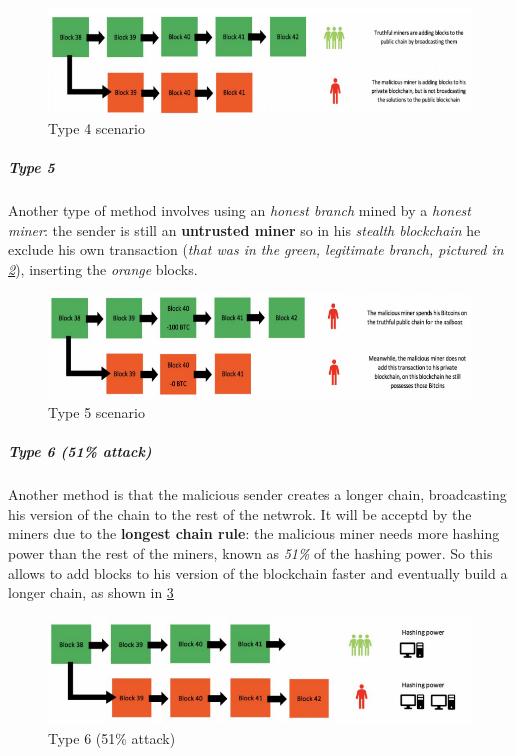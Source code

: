 \documentclass[10pt,a4paper]{report}
\begin{document}
\begin{figure}[h]
	\centering
	\includegraphics[scale=0.50]{images/Pasted image 20230412113653.png}
  	\caption{Type 4 scenario}
  	\label{type-4}
  \end{figure}

\subparagraph{Type 5}\label{sec:type-5}
Another type of method involves using an \textit{honest branch} mined by a \textit{honest miner}: the sender is still an \textbf{untrusted miner} so in his \textit{stealth blockchain} he exclude his own transaction (\textit{that was in the green, legitimate branch, pictured in \ref{type-5-attack}}), inserting the \textit{orange} blocks.
\begin{figure}[h]
	\centering
	\includegraphics[scale=0.50]{images/Pasted image 20230412113953.png}
	\caption{Type 5 scenario}
\label{type-5-attack}
\end{figure}

\subparagraph{Type 6 (51\% attack)}\label{sec:type-6-51-attack}
Another method is that the malicious sender creates a longer chain, broadcasting his version of the chain to the rest of the netwrok. It will be acceptd by the miners due to the \textbf{longest chain rule}: the malicious miner needs more hashing power than the rest of the miners, known as \textit{51\%} of the hashing power. So this allows to add blocks to his version of the blockchain faster and eventually build a longer chain, as shown in \ref{51-attack}
\begin{figure}[h]
	\centering
	\includegraphics[scale=0.50]{images/Pasted image 20230417104836.png}
	\caption{Type 6 (51\% attack)}
	\label{51-attack}
\end{figure}
\end{document}
